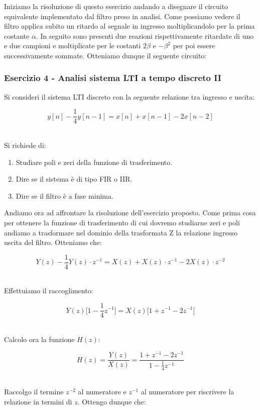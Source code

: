 \documentclass[../main.tex]{subfiles}
\begin{document}
Iniziamo la risoluzione di questo esercizio andando a disegnare il circuito equivalente implementato dal filtro preso in analisi.
Come possiamo vedere il filtro applica subito un ritardo al segnale in ingresso moltiplicandolo per la prima costante $\alpha$. In seguito sono presenti due reazioni rispettivamente ritardate di uno e due campioni e moltiplicate per le costanti $2\beta$ e $-\beta^2$ per poi essere successivamente sommate.
Otteniamo dunque il seguente circuito:


\subsubsection{Esercizio 4 - Analisi sistema LTI a tempo discreto II}

Si consideri il sistema LTI discreto con la seguente relazione tra ingresso e uscita:

\[  y[n] - \frac{1}{4} y[n - 1] = x[n] + x[n - 1] - 2x[n - 2] \]\

Si richiede di:

\begin{enumerate}
	\item[\textbf{1)}] Studiare poli e zeri della funzione di trasferimento.
	\item[\textbf{2)}] Dire se il sistema è di tipo FIR o IIR.
	\item[\textbf{3)}] Dire se il filtro è a fase minima.
\end{enumerate}

Andiamo ora ad affrontare la risoluzione dell'esercizio proposto.
Come prima cosa per ottenere la funzione di trasferimento di cui dovremo studiarne zeri e poli andiamo a trasformare nel dominio della trasformata Z la relazione ingresso uscita del filtro. Otteniamo che:

\[ Y(z) - \frac{1}{4} Y(z)\cdot z^{-1}  = X(z) + X(z) \cdot z^{-1} -2X(z) \cdot z^{-2} \]\

Effettuiamo il raccoglimento:


\[ Y(z) \big[1 - \frac{1}{4} z^{-1}\big]  = X(z) \big[1 + z^{-1} -2z^{-1}\big]  \]\

Calcolo ora la funzione $H(z)$:

\[ H(z) = \frac{Y(z)}{X(z)} = \frac{1 + z^{-1} -2z^{-1} }{1 - \frac{1}{4} z^{-1}} \]\

Raccolgo il termine $z^{-2}$ al numeratore e $z^{-1}$ al numeratore per riscrivere la relazione in termini di $z$. Ottengo dunque che:
\end{document}

